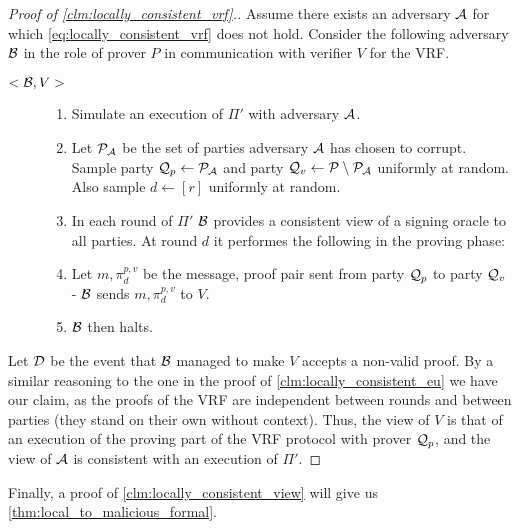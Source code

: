 \begin{proof}[Proof of \cref{clm:locally_consistent_vrf}.]
	Assume there exists an adversary $\mathcal{A}$ for which \cref{eq:locally_consistent_vrf} does not hold. Consider the following adversary $\mathcal{B}$ in the role of prover $P$ in communication with verifier $V$ for the VRF.
	{\samepage
			\begin{description}
		\item[$<\mathcal{B}, V>$]		
		\begin{enumerate}
			\item Simulate an execution of $\Pi'$ with adversary $\mathcal{A}$.
			
			\item Let $\mathcal{P}_{\mathcal{A}}$ be the set of parties adversary $\mathcal{A}$ has chosen to corrupt. Sample party ${\mathcal{Q}_p \leftarrow \mathcal{P}_{\mathcal{A}}}$ and party $\mathcal{Q}_v \leftarrow \mathcal{P} \setminus \mathcal{P}_{\mathcal{A}}$ uniformly at random. Also sample $d \leftarrow [r]$ uniformly at random.
			
			\item In each round of $\Pi'$ $\mathcal{B}$ provides a consistent view of a signing oracle to all parties. At round $d$ it performes the following in the proving phase:
			
			\item Let $m, \pi^{p,v}_d$ be the message, proof pair sent from party $\mathcal{Q}_p$ to party $\mathcal{Q}_v$ - $\mathcal{B}$ sends $m, \pi^{p,v}_d$ to $V$.
			
			\item $\mathcal{B}$ then halts.
		\end{enumerate}
	\end{description}
}

Let $\mathcal{D}$ be the event that $\mathcal{B}$ managed to make $V$ accepts a non-valid proof. By a similar reasoning to the one in the proof of \cref{clm:locally_consistent_eu} we have our claim, as the proofs of the VRF are independent between rounds and between parties (\ie they stand on their own without context). Thus, the view of $V$ is that of an execution of the proving part of the VRF protocol with prover $\mathcal{Q}_p$, and the view of $\mathcal{A}$ is consistent with an execution of $\Pi'$.
\end{proof}

Finally, a proof of \cref{clm:locally_consistent_view} will give us \cref{thm:local_to_malicious_formal}.

